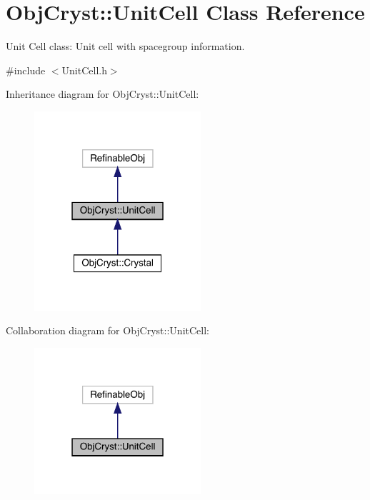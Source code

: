 \hypertarget{class_obj_cryst_1_1_unit_cell}{}\section{Obj\+Cryst\+::Unit\+Cell Class Reference}
\label{class_obj_cryst_1_1_unit_cell}


Unit Cell class\+: Unit cell with spacegroup information.  




{\ttfamily \#include $<$Unit\+Cell.\+h$>$}



Inheritance diagram for Obj\+Cryst\+::Unit\+Cell\+:
\nopagebreak
\begin{figure}[H]
\begin{center}
\leavevmode
\includegraphics[width=175pt]{class_obj_cryst_1_1_unit_cell__inherit__graph}
\end{center}
\end{figure}


Collaboration diagram for Obj\+Cryst\+::Unit\+Cell\+:
\nopagebreak
\begin{figure}[H]
\begin{center}
\leavevmode
\includegraphics[width=175pt]{class_obj_cryst_1_1_unit_cell__coll__graph}
\end{center}
\end{figure}
